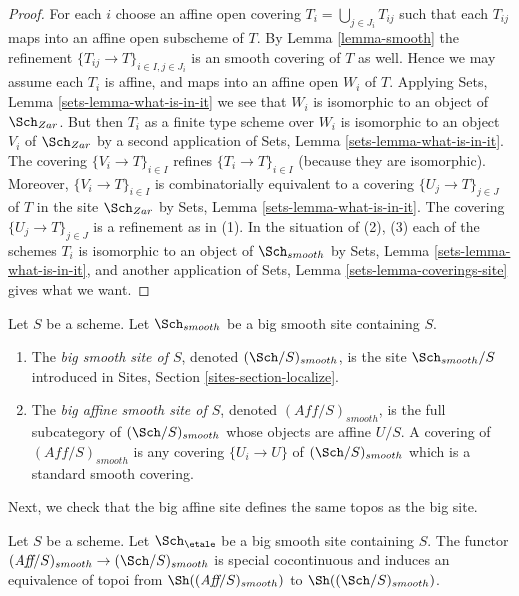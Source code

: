 \begin{proof}
For each $i$ choose an affine open covering $T_i = \bigcup_{j \in J_i} T_{ij}$
such that each $T_{ij}$ maps into an affine open subscheme of $T$. By
Lemma \ref{lemma-smooth}
the refinement $\{T_{ij} \to T\}_{i \in I, j \in J_i}$ is an smooth covering
of $T$ as well. Hence we may assume each $T_i$ is affine, and maps into
an affine open $W_i$ of $T$. Applying
Sets, Lemma \ref{sets-lemma-what-is-in-it}
we see that $W_i$ is isomorphic to an object of $\Sch_{Zar}$.
But then $T_i$ as a finite type scheme over $W_i$
is isomorphic to an object $V_i$ of $\Sch_{Zar}$ by a second
application of
Sets, Lemma \ref{sets-lemma-what-is-in-it}.
The covering $\{V_i \to T\}_{i \in I}$ refines $\{T_i \to T\}_{i \in I}$
(because they are isomorphic).
Moreover, $\{V_i \to T\}_{i \in I}$ is combinatorially equivalent to a
covering $\{U_j \to T\}_{j \in J}$ of $T$ in the site
$\Sch_{Zar}$ by
Sets, Lemma \ref{sets-lemma-what-is-in-it}.
The covering $\{U_j \to T\}_{j \in J}$ is a refinement as in (1).
In the situation of (2), (3) each of the
schemes $T_i$ is isomorphic to an object of $\Sch_{smooth}$ by
Sets, Lemma \ref{sets-lemma-what-is-in-it},
and another application of
Sets, Lemma \ref{sets-lemma-coverings-site}
gives what we want.
\end{proof}

\begin{definition}
\label{definition-big-small-smooth}
Let $S$ be a scheme. Let $\Sch_{smooth}$ be a big smooth
site containing $S$.
\begin{enumerate}
\item The {\it big smooth site of $S$}, denoted
$(\Sch/S)_{smooth}$, is the site $\Sch_{smooth}/S$
introduced in Sites, Section \ref{sites-section-localize}.
\item The {\it big affine smooth site of $S$}, denoted
$(\textit{Aff}/S)_{smooth}$, is the full subcategory of
$(\Sch/S)_{smooth}$ whose objects are affine $U/S$.
A covering of $(\textit{Aff}/S)_{smooth}$ is any covering
$\{U_i \to U\}$ of $(\Sch/S)_{smooth}$ which is a
standard smooth covering.
\end{enumerate}
\end{definition}

\noindent
Next, we check that the big affine site defines the same
topos as the big site.

\begin{lemma}
\label{lemma-affine-big-site-smooth}
Let $S$ be a scheme. Let $\Sch_\etale$ be a big smooth
site containing $S$.
The functor
$(\textit{Aff}/S)_{smooth} \to (\Sch/S)_{smooth}$
is special cocontinuous and induces an equivalence of topoi from
$\Sh((\textit{Aff}/S)_{smooth})$ to
$\Sh((\Sch/S)_{smooth})$.
\end{lemma}

